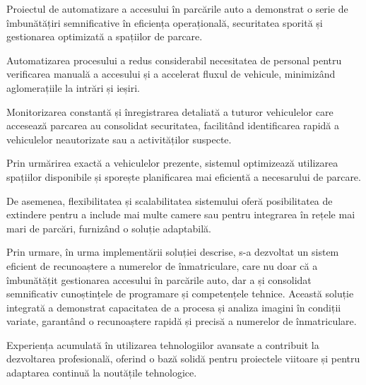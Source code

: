 \documentclass[a4paper,12pt]{report}
\begin{document}
Proiectul de automatizare a accesului în parcările auto a demonstrat o serie de îmbunătățiri semnificative în eficiența operațională, securitatea sporită și gestionarea optimizată a spațiilor de parcare.

Automatizarea procesului a redus considerabil necesitatea de personal pentru verificarea manuală a accesului și a accelerat fluxul de vehicule, minimizând aglomerațiile la intrări și ieșiri.

Monitorizarea constantă și înregistrarea detaliată a tuturor vehiculelor care accesează parcarea au consolidat securitatea, facilitând identificarea rapidă a vehiculelor neautorizate sau a activităților suspecte.

Prin urmărirea exactă a vehiculelor prezente, sistemul optimizează utilizarea spațiilor disponibile și sporește planificarea mai eficientă a necesarului de parcare.

De asemenea, flexibilitatea și scalabilitatea sistemului oferă posibilitatea de extindere pentru a include mai multe camere sau pentru integrarea în rețele mai mari de parcări, furnizând o soluție adaptabilă.

Prin urmare, în urma implementării soluției descrise, s-a dezvoltat un sistem eficient de recunoaștere a numerelor de înmatriculare, care nu doar că a îmbunătățit gestionarea accesului în parcările auto, dar a și consolidat semnificativ cunoștințele de programare și competențele tehnice. Această soluție integrată a demonstrat capacitatea de a procesa și analiza imagini în condiții variate, garantând o recunoaștere rapidă și precisă a numerelor de înmatriculare.

Experiența acumulată în utilizarea tehnologiilor avansate a contribuit la dezvoltarea profesională, oferind o bază solidă pentru proiectele viitoare și pentru adaptarea continuă la noutățile tehnologice.



\cite{1}
\cite{2}
\end{document}

